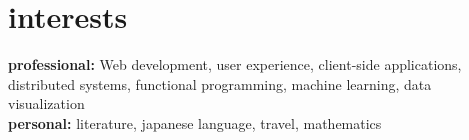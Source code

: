 \documentclass[]{friggeri-cv} %
\begin{document}

\section{interests}

\textbf{professional:} Web development, user experience, client-side applications, distributed systems, functional programming, machine learning, data visualization \\
\textbf{personal:} literature, japanese language, travel, mathematics

\end{document}
